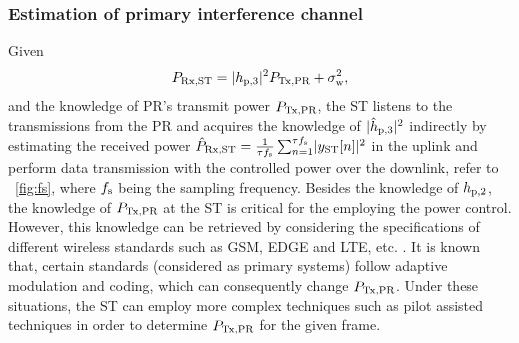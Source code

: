 \subsubsection{Estimation of primary interference channel}
Given 
\begin{equation}
P_{\text{Rx,ST}} = |h_{\text{p,3}}|^2 P_{\text{Tx,PR}} + \sigma^2_{\text{w}} \label{eq:prcvd}, 
\end{equation}
and the knowledge of PR's transmit power $P_{\text{Tx,PR}}$, the ST listens to the transmissions from the PR and acquires the knowledge of $|\hat{h}_{\text{p,3}}|^2$ indirectly by estimating the received power $\hat{P}_{\text{Rx,ST}} = {\frac{1}{{\tau f_{\text{s}}}}\sum_{n=1}^{\tau f_{\text{s}}}} { |y_{\text{ST}}[n]|^2}$ in the uplink and perform data transmission with the controlled power over the downlink, refer to \figurename~\ref{fig:fs}, where $f_{\text{s}}$ being the sampling frequency. Besides the knowledge of $h_{\text{p,2}}$, the knowledge of $P_{\text{Tx,PR}}$ at the ST is critical for the employing the power control. However, this knowledge can be retrieved by considering the specifications of different wireless standards such as GSM, EDGE and LTE, etc. \cite{Sharma14}. It is known that, certain standards (considered as primary systems) follow adaptive modulation and coding, which can consequently change $P_{\text{Tx,PR}}$. Under these situations, the ST can employ more complex techniques such as pilot assisted techniques in order to determine $P_{\text{Tx,PR}}$ for the given frame.%

